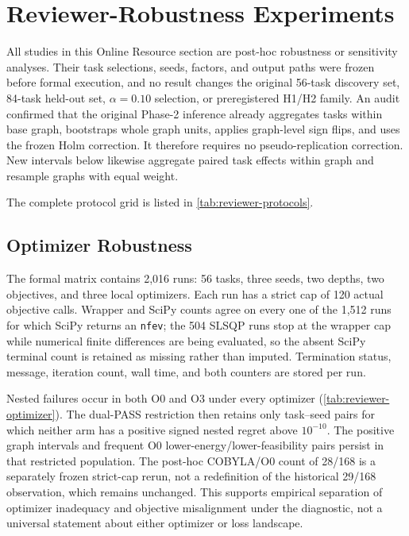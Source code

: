 \section{Reviewer-Robustness Experiments}
\label{app:reviewer-robustness}

All studies in this Online Resource section are post-hoc robustness or sensitivity analyses.
Their task selections, seeds, factors, and output paths were frozen before
formal execution, and no result changes the original 56-task discovery set,
84-task held-out set, $\alpha=0.10$ selection, or preregistered H1/H2 family.
An audit confirmed that the original Phase-2 inference already aggregates
tasks within base graph, bootstraps whole graph units, applies graph-level
sign flips, and uses the frozen Holm correction. It therefore requires no
pseudo-replication correction. New intervals below likewise aggregate paired
task effects within graph and resample graphs with equal weight.

The complete protocol grid is listed in \cref{tab:reviewer-protocols}.


\FloatBarrier
\subsection{Optimizer Robustness}

The formal matrix contains 2,016 runs: 56 tasks, three seeds, two depths, two
objectives, and three local optimizers. Each run has a strict cap of 120
actual objective calls. Wrapper and SciPy counts agree on every one of the
1,512 runs for which SciPy returns an \texttt{nfev}; the 504 SLSQP runs stop
at the wrapper cap while numerical finite differences are being evaluated, so
the absent SciPy terminal count is retained as missing rather than imputed.
Termination status, message, iteration count, wall time, and both counters are
stored per run.

Nested failures occur in both O0 and O3 under every optimizer
(\cref{tab:reviewer-optimizer}). The dual-PASS restriction then retains only
task--seed pairs for which neither arm has a positive signed nested regret
above $10^{-10}$. The positive graph intervals and frequent O0
lower-energy/lower-feasibility pairs persist in that restricted population.
The post-hoc COBYLA/O0 count of 28/168 is a separately frozen strict-cap
rerun, not a redefinition of the historical 29/168 observation, which remains
unchanged.
This supports empirical separation of optimizer inadequacy and objective
misalignment under the diagnostic, not a universal statement about either
optimizer or loss landscape.

